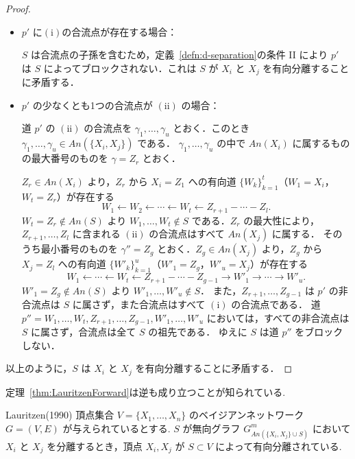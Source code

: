 \documentclass[uplatex, dvipdfmx]{jsarticle}
\begin{document}
\begin{proof}
  \begin{itemize}
  
  \item $p'$ に$(\mathrm{i})$の合流点が存在する場合：
  
  $S$ は合流点の子孫を含むため，定義~\ref{defn:d-separation}の条件 II により $p'$ は $S$ によってブロックされない．これは $S$ が $X_i$ と $X_j$ を有向分離することに矛盾する．

  \item $p'$ の少なくとも1つの合流点が $(\mathrm{ii})$ の場合：
  
  道 $p'$ の $(\mathrm{ii})$ の合流点を $\gamma_1, \dots, \gamma_u$ とおく．このとき $\gamma_1, \dots, \gamma_u \in An(\{X_i, X_j\})$ である．
  $\gamma_1, \dots, \gamma_u$ の中で $An(X_i)$ に属するものの最大番号のものを $\gamma = Z_r$ とおく．

  $Z_r \in An(X_i)$ より，$Z_r$ から $X_i = Z_1$ への有向道 $\{W_k\}_{k=1}^t$（$W_1 = X_i$，$W_t = Z_r$）が存在する
  \[
    W_1 \leftarrow W_2 \leftarrow \cdots \leftarrow W_t \leftarrow Z_{r+1} - \cdots - Z_l.
  \]
  $W_t = Z_r \notin An(S)$ より $W_1, \dots, W_t \notin S$ である．$Z_r$ の最大性により，$Z_{r+1}, \dots, Z_l$ に含まれる $(\mathrm{ii})$ の合流点はすべて $An(X_j)$ に属する．
  そのうち最小番号のものを $\gamma'' = Z_g$ とおく．$Z_g \in An(X_j)$ より，$Z_g$ から $X_j = Z_l$ への有向道 $\{W'_k\}_{k=1}^u$（$W'_1 = Z_g$，$W'_u = X_j$）が存在する
  \[
    W_1 \leftarrow \cdots \leftarrow W_t \leftarrow Z_{r+1} - \cdots - Z_{g-1} \to W'_1 \to \cdots \to W'_u.
  \]
  $W'_1 = Z_g \notin An(S)$ より $W'_1, \dots, W'_u \notin S$．
  また，$Z_{r+1}, \dots, Z_{g-1}$ は $p'$ の非合流点は $S$ に属さず，また合流点はすべて $(\mathrm{i})$ の合流点である．
  道 $p'' = W_1, \dots, W_t, Z_{r+1}, \dots, Z_{g-1}, W'_1, \dots, W'_u$ においては，すべての非合流点は $S$ に属さず，合流点は全て $S$ の祖先である．
  ゆえに $S$ は道 $p''$ をブロックしない．
  \end{itemize}

  以上のように，$S$ は $X_i$ と $X_j$ を有向分離することに矛盾する．
\end{proof}

定理~\ref{thm:LauritzenForward}は逆も成り立つことが知られている.

\begin{thm}[label={thm:LauritzenBackward}]{Lauritzen(1990)}
  頂点集合 $V = \{X_1, \dots, X_n\}$ のベイジアンネットワーク $G = (V, E)$ が与えられているとする.
  $S$ が無向グラフ $G^m_{An(\{X_i, X_j\} \cup S)}$ において $X_i$ と $X_j$ を分離するとき，頂点 $X_i, X_j$ が $S \subset V$ によって有向分離されている.
\end{thm}
\end{document}
